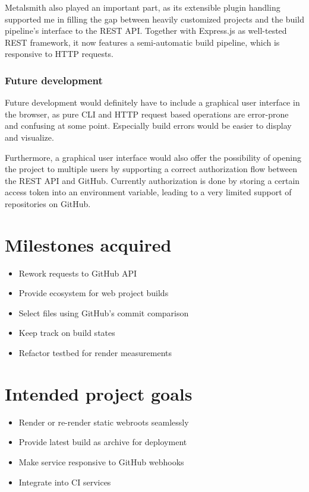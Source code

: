 \documentclass[a4paper,english,11pt]{report}
\begin{document}
Metalsmith also played an important part, as its extensible plugin handling supported me in filling the gap between heavily customized projects and the build pipeline's interface to the REST API. Together with Express.js as well-tested REST framework, it now features a semi-automatic build pipeline, which is responsive to HTTP requests.

\subsection{Future development}
Future development would definitely have to include a graphical user interface in the browser, as pure CLI and HTTP request based operations are error-prone and confusing at some point. Especially build errors would be easier to display and visualize.

Furthermore, a graphical user interface would also offer the possibility of opening the project to multiple users by supporting a correct authorization flow between the REST API and GitHub. Currently authorization is done by storing a certain access token into an environment variable, leading to a very limited support of repositories on GitHub.

\chapter{Milestones acquired}

\begin{itemize}
\item Rework requests to GitHub API
\item Provide ecosystem for web project builds
\item Select files using GitHub's commit comparison
\item Keep track on build states
\item Refactor testbed for render measurements
\end{itemize}



\chapter{Intended project goals}

\begin{itemize}
\item Render or re-render static webroots seamlessly
\item Provide latest build as archive for deployment
\item Make service responsive to GitHub webhooks
\item Integrate into CI services
\end{itemize}


\end{document}
